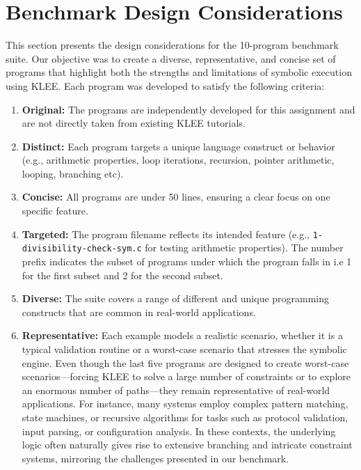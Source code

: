 \documentclass[conference]{IEEEtran}
\begin{document}


\section{Benchmark Design Considerations}
This section presents the design considerations for the 10-program benchmark suite. Our objective was to create a diverse, representative, and concise set of programs that highlight both the strengths and limitations of symbolic execution using KLEE. Each program was developed to satisfy the following criteria: 
\begin{enumerate}
    \item \textbf{Original:} The programs are independently developed for this assignment and are not directly taken from existing KLEE tutorials.
    \item \textbf{Distinct:} Each program targets a unique language construct or behavior (e.g., arithmetic properties, loop iterations, recursion, pointer arithmetic, looping, branching etc).
    \item \textbf{Concise:} All programs are under 50 lines, ensuring a clear focus on one specific feature.
    \item \textbf{Targeted:} The program filename reflects its intended feature (e.g., \texttt{1-divisibility-check-sym.c} for testing arithmetic properties). The number prefix indicates the subset of programs under which the program falls in i.e 1 for the first subset and 2 for the second subset.
    \item \textbf{Diverse:} The suite covers a range of different and unique programming constructs that are common in real-world applications.
    \item \textbf{Representative:} Each example models a realistic scenario, whether it is a typical validation routine or a worst-case scenario that stresses the symbolic engine. Even though the last five programs are designed to create worst-case scenarios—forcing KLEE to solve a large number of constraints or to explore an enormous number of paths—they remain representative of real-world applications. For instance, many systems employ complex pattern matching, state machines, or recursive algorithms for tasks such as protocol validation, input parsing, or configuration analysis. In these contexts, the underlying logic often naturally gives rise to extensive branching and intricate constraint systems, mirroring the challenges presented in our benchmark.
\end{enumerate}
\end{document}
